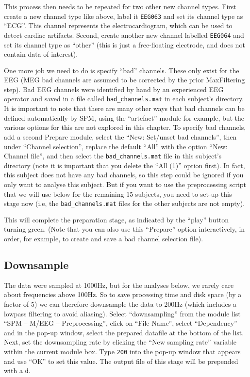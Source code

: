 This process then needs to be repeated for two other new channel types. First create a new channel type like above, label it \texttt{EEG063} and set its channel type as ``ECG''. This channel represents the electrocardiogram, which can be used to detect cardiac artifacts. Second, create another new channel labelled \texttt{EEG064} and set its channel type as ``other'' (this is just a free-floating electrode, and does not contain data of interest).

One more job we need to do is specify ``bad'' channels. These only exist for the EEG (MEG bad channels are assumed to be corrected by the prior MaxFiltering step). Bad EEG channels were identified by hand by an experienced EEG operator and saved in a file called \texttt{bad\_channels.mat} in each subject's directory. It is important to note that there are many other ways that bad channels can be defined automatically by SPM, using the ``artefact'' module for example, but the various options for this are not explored in this chapter. To specify bad channels, add a second Prepare module, select the ``New: Set/unset bad channels'', then under ``Channel selection'', replace the default ``All'' with the option ``New: Channel file'', and then select the \texttt{bad\_channels.mat} file in this subject's directory (note it is important that you delete the ``All (1)'' option first). In fact, this subject does not have any bad channels, so this step could be ignored if you only want to analyse this subject. But if you want to use the preprocessing script that we will use below for the remaining 15 subjects, you need to set-up this stage now (i.e, the \texttt{bad\_channels.mat} files for the other subjects are not empty).

This will complete the preparation stage, as indicated by the ``play'' button turning green. (Note that you can also use this ``Prepare'' option interactively, in order, for example, to create and save a bad channel selection file).

\subsection{Downsample}

The data were sampled at 1000Hz, but for the analyses below, we rarely care about frequencies above 100Hz. So to save processing time and disk space (by a factor of 5) we can therefore downsample the data to 200Hz (which includes a lowpass filtering to avoid aliasing). Select ``downsampling'' from the module list ``SPM -- M/EEG -- Preprocessing'', click on ``File Name'', select ``Dependency'' and in the pop-up window, select the prepared datafile at the bottom of the list. Next, set the downsampling rate by clicking the ``New sampling rate'' variable within the current module box. Type \texttt{200} into the pop-up window that appears and use ``OK'' to set this value. The output file of this stage will be prepended with a \texttt{d}. 

